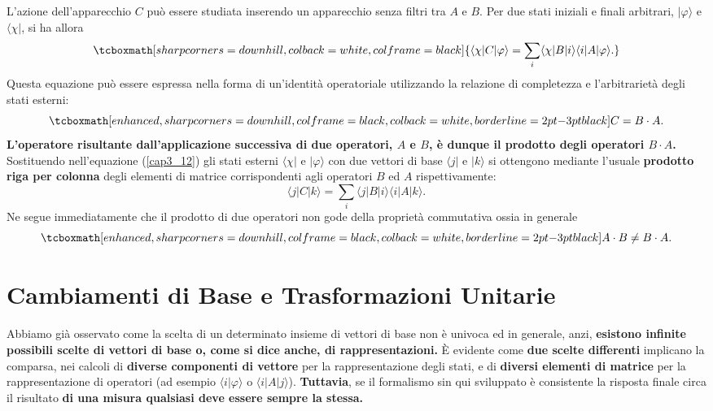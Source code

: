 \documentclass[a4paper,12pt,oneside]{book}
\begin{document}
L'azione dell'apparecchio $C$ può essere studiata inserendo un apparecchio senza filtri tra $A$ e $B$. Per due stati iniziali e finali arbitrari, $| \varphi \rangle $ e $\langle \chi |$, si ha allora
	\begin{equation}
		\tcboxmath[sharp corners=downhill, colback=white, colframe=black]{
			\langle \chi | C | \varphi \rangle = \sum \limits_{i} \langle \chi | B | i \rangle \langle i | A | \varphi \rangle .
			}
	\label{cap3_12}
	\end{equation}
Questa equazione può essere espressa nella forma di un'identità operatoriale utilizzando la relazione di completezza e l'arbitrarietà degli stati esterni:
	\begin{equation}
		\tcboxmath[enhanced, sharp corners=downhill, colframe=black, colback=white, borderline={2pt}{-3pt}{black}]{
		C= B \cdot A .
		}
	\end{equation}
\textbf{L'operatore risultante dall'applicazione successiva di due operatori, $A$ e $B$, è dunque il prodotto degli operatori $B \cdot A$.}\\

Sostituendo nell'equazione (\ref{cap3_12}) gli stati esterni $\langle \chi |$ e $ | \varphi \rangle $ con due vettori di base $\langle j |$ e $| k \rangle$ si ottengono mediante l'usuale \textbf{prodotto riga per colonna} degli elementi di matrice corrispondenti agli operatori $B$ ed $A$ rispettivamente:
	\begin{equation}
		\langle j | C | k \rangle  = \sum \limits_{i} \langle j | B | i \rangle \langle i | A | k \rangle .
	\end{equation}
Ne segue immediatamente che il prodotto di due operatori non gode della proprietà commutativa ossia in generale
	\begin{equation}
		\tcboxmath[enhanced, sharp corners=downhill, colframe=black, colback=white, borderline={2pt}{-3pt}{black}]{
			A \cdot B \neq B \cdot A . 
			}
	\end{equation}

\section{Cambiamenti di Base e Trasformazioni Unitarie}

Abbiamo già osservato come la scelta di un determinato insieme di vettori di base non è univoca ed in generale, anzi, \textbf{esistono infinite possibili scelte di vettori di base o, come si dice anche, di rappresentazioni.} È evidente come \textbf{due scelte differenti }implicano la comparsa, nei calcoli di \textbf{diverse componenti di vettore} per la rappresentazione degli stati, e di \textbf{diversi elementi di matrice} per la rappresentazione di operatori (ad esempio $\langle i | \varphi \rangle $ o  $ \langle i | A | j \rangle $). \textbf{Tuttavia}, se il formalismo sin qui sviluppato è consistente la risposta finale circa il risultato \textbf{di una misura qualsiasi deve essere sempre la stessa.}\\
\end{document}
